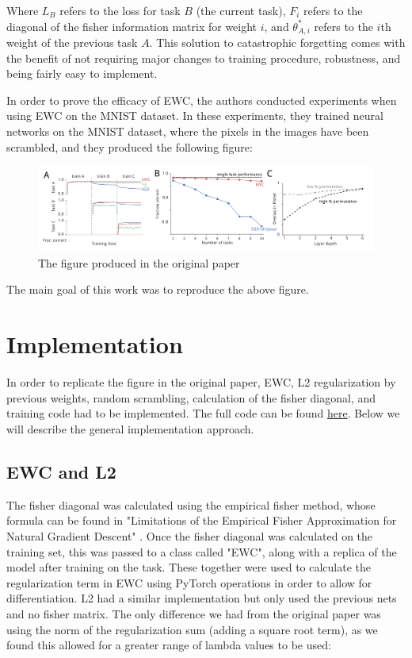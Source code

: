 \documentclass{article}
\begin{document}
Where $L_{B}$ refers to the loss for task $B$ (the current task), $F_i$ refers to the diagonal of the fisher information matrix for weight $i$, and $\theta^{*}_{A,i}$ refers to the $i$th weight of the previous task $A$. This solution to catastrophic forgetting comes with the benefit of not requiring major changes to training procedure, robustness, and being fairly easy to implement. 

In order to prove the efficacy of EWC, the authors conducted experiments when using EWC on the MNIST dataset. In these experiments, they trained neural networks on the MNIST dataset, where the pixels in the images have been scrambled, and they produced the following figure:

\begin{figure}[h]
\centering
\includegraphics[scale=0.25]{../Figures/Orig_All.png}
\caption{The figure produced in the original paper}
\label{fig:orig_all}
\end{figure}

The main goal of this work was to reproduce the above figure.

\section{Implementation}

In order to replicate the figure in the original paper, EWC, L2 regularization by previous weights, random scrambling, calculation of the fisher diagonal, and training code had to be implemented. The full code can be found \href{https://github.com/spohngellert-o/Pytorch-EWC-Replication}{here}. Below we will describe the general implementation approach.


\subsection{EWC and L2}

The fisher diagonal was calculated using the empirical fisher method, whose formula can be found in "Limitations of the Empirical Fisher Approximation for Natural Gradient Descent" \cite{empirical}. Once the fisher diagonal was calculated on the training set, this was passed to a class called "EWC", along with a replica of the model after training on the task. These together were used to calculate the regularization term in EWC using PyTorch operations in order to allow for differentiation. L2 had a similar implementation but only used the previous nets and no fisher matrix. The only difference we had from the original paper was using the norm of the regularization sum (adding a square root term), as we found this allowed for a greater range of lambda values to be used:
\end{document}
